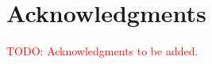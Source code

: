 \documentclass[preprint,12pt]{elsarticle}
\begin{document}








\section*{Acknowledgments}
\textcolor{red}{TODO: Acknowledgments to be added.}



\end{document}
